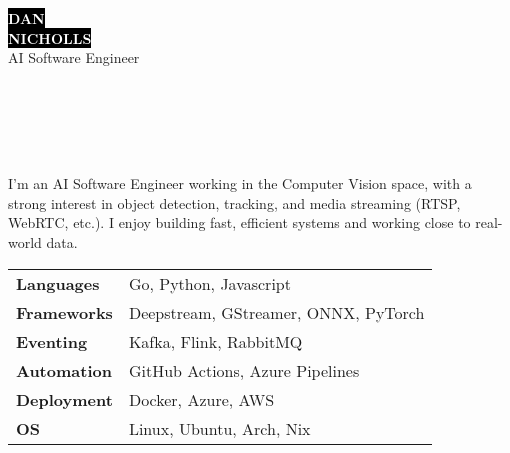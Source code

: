 \documentclass[9pt]{extarticle}
\begin{document}

\begin{minipage}[t]{0.40\textwidth}
	\vspace{-\baselineskip}
	\colorbox{black}{{\HUGE\textcolor{white}{\textbf{\MakeUppercase{Dan}}}}}\\[2pt]
	\colorbox{black}{{\HUGE\textcolor{white}{\textbf{\MakeUppercase{Nicholls}}}}}\\[6pt]
	\vspace{6pt}
	{\LARGE AI Software Engineer}
\end{minipage}
\hfill
\begin{minipage}[t]{0.50\textwidth}
	\vspace{-\baselineskip}
		\\
		\\
		\\
		\\
\end{minipage}

\vspace{0.6em}


\begin{minipage}[t]{0.45\textwidth}
	\vspace{-\baselineskip}


	I'm an AI Software Engineer working in the Computer Vision space, with a strong interest in object detection, tracking, and media streaming (RTSP, WebRTC, etc.). I enjoy building fast, efficient systems and working close to real-world data.

\end{minipage}
\hfill 
\begin{minipage}[t]{0.5\textwidth}
	\vspace{-\baselineskip}


	\begin{tabular}{@{}p{8em} l@{}}
	\textbf{Languages}   & Go, Python, Javascript \\
	\textbf{Frameworks}  & Deepstream, GStreamer, ONNX, PyTorch \\
	\textbf{Eventing}	 & Kafka, Flink, RabbitMQ \\
	\textbf{Automation}  & GitHub Actions, Azure Pipelines \\
	\textbf{Deployment}  & Docker, Azure, AWS \\
	\textbf{OS}          & Linux, Ubuntu, Arch, Nix \\
	\end{tabular}
\end{minipage}
\end{document}

